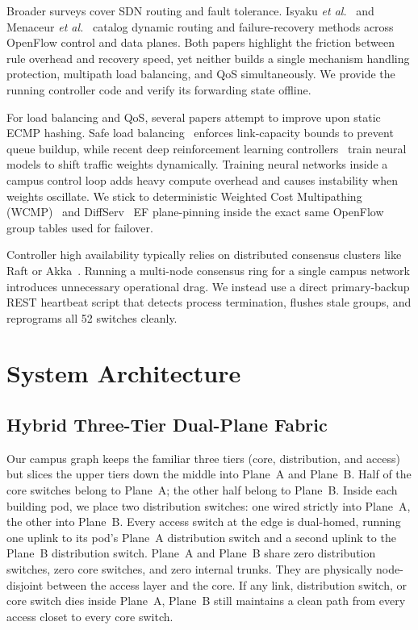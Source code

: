 \documentclass[conference]{IEEEtran}
\begin{document}
Broader surveys cover SDN routing and fault tolerance. Isyaku \emph{et al.}~\cite{isyaku} and Menaceur \emph{et al.}~\cite{menaceur} catalog dynamic routing and failure-recovery methods across OpenFlow control and data planes. Both papers highlight the friction between rule overhead and recovery speed, yet neither builds a single mechanism handling protection, multipath load balancing, and QoS simultaneously. We provide the running controller code and verify its forwarding state offline.

For load balancing and QoS, several papers attempt to improve upon static ECMP hashing. Safe load balancing~\cite{safelb} enforces link-capacity bounds to prevent queue buildup, while recent deep reinforcement learning controllers~\cite{transformer} train neural models to shift traffic weights dynamically. Training neural networks inside a campus control loop adds heavy compute overhead and causes instability when weights oscillate. We stick to deterministic Weighted Cost Multipathing (WCMP)~\cite{wcmp} and DiffServ~\cite{diffserv} EF plane-pinning inside the exact same OpenFlow group tables used for failover.

Controller high availability typically relies on distributed consensus clusters like Raft or Akka~\cite{ha2024}. Running a multi-node consensus ring for a single campus network introduces unnecessary operational drag. We instead use a direct primary-backup REST heartbeat script that detects process termination, flushes stale groups, and reprograms all 52 switches cleanly.

\section{System Architecture}\label{sec:arch}
\subsection{Hybrid Three-Tier Dual-Plane Fabric}
Our campus graph keeps the familiar three tiers (core, distribution, and access) but slices the upper tiers down the middle into Plane~A and Plane~B. Half of the core switches belong to Plane~A; the other half belong to Plane~B. Inside each building pod, we place two distribution switches: one wired strictly into Plane~A, the other into Plane~B. Every access switch at the edge is dual-homed, running one uplink to its pod's Plane~A distribution switch and a second uplink to the Plane~B distribution switch. Plane~A and Plane~B share zero distribution switches, zero core switches, and zero internal trunks. They are physically node-disjoint between the access layer and the core. If any link, distribution switch, or core switch dies inside Plane~A, Plane~B still maintains a clean path from every access closet to every core switch.
\end{document}
